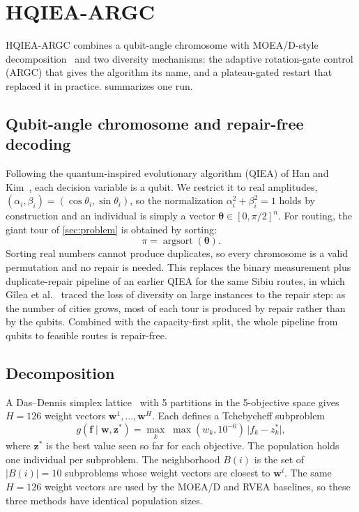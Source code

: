 \section{HQIEA-ARGC}
\label{sec:algorithm}

HQIEA-ARGC combines a qubit-angle chromosome with MOEA/D-style
decomposition~\cite{zhang2007moead} and two diversity mechanisms: the adaptive
rotation-gate control (ARGC) that gives the algorithm its name, and a
plateau-gated restart that replaced it in practice.
 summarizes one run.

\subsection{Qubit-angle chromosome and repair-free decoding}
Following the quantum-inspired evolutionary algorithm (QIEA) of Han and
Kim~\cite{han2002qea}, each decision variable is a qubit. We restrict it to real
amplitudes, $(\alpha_i,\beta_i)=(\cos\theta_i,\sin\theta_i)$, so the normalization
$\alpha_i^2+\beta_i^2=1$ holds by construction and an individual is simply a vector
$\boldsymbol\theta\in[0,\pi/2]^n$. For routing, the giant tour of
\cref{sec:problem} is obtained by sorting:
\begin{equation}
\pi=\operatorname{argsort}(\boldsymbol\theta).
\end{equation}
Sorting real numbers cannot produce duplicates, so every chromosome is a valid
permutation and no repair is needed. This replaces the binary measurement plus
duplicate-repair pipeline of an earlier QIEA for the same Sibiu routes, in which
Gîlea et al.~\cite{gilea2026scalable} traced the loss of diversity on large
instances to the repair step: as the number of cities grows, most of each tour is
produced by repair rather than by the qubits. Combined with the capacity-first
split, the whole pipeline from qubits to feasible routes is repair-free.

\subsection{Decomposition}
A Das--Dennis simplex lattice~\cite{das1998nbi} with 5 partitions in the
5-objective space gives $H=126$ weight vectors $\mathbf w^1,\dots,\mathbf w^H$.
Each defines a Tchebycheff subproblem
\begin{equation}
g(\mathbf f\mid\mathbf w,\mathbf z^\ast)=\max_{k}\;\max(w_k,10^{-6})\,
\lvert f_k-z^\ast_k\rvert,
\end{equation}
where $\mathbf z^\ast$ is the best value seen so far for each objective. The
population holds one individual per subproblem. The neighborhood $B(i)$ is the
set of $|B(i)|=10$ subproblems whose weight vectors are closest to $\mathbf w^i$.
The same $H=126$ weight vectors are used by the MOEA/D and RVEA baselines, so
these three methods have identical population sizes.

